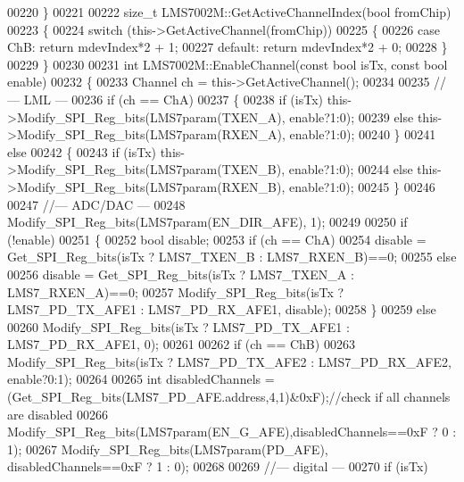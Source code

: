 \begin{DoxyCode}
00220 \}
00221 
00222 \textcolor{keywordtype}{size\_t} LMS7002M::GetActiveChannelIndex(\textcolor{keywordtype}{bool} fromChip)
00223 \{
00224     \textcolor{keywordflow}{switch} (this->GetActiveChannel(fromChip))
00225     \{
00226     \textcolor{keywordflow}{case} ChB: \textcolor{keywordflow}{return} mdevIndex*2 + 1;
00227     \textcolor{keywordflow}{default}: \textcolor{keywordflow}{return} mdevIndex*2 + 0;
00228     \}
00229 \}
00230 
00231 \textcolor{keywordtype}{int} LMS7002M::EnableChannel(\textcolor{keyword}{const} \textcolor{keywordtype}{bool} isTx, \textcolor{keyword}{const} \textcolor{keywordtype}{bool} enable)
00232 \{
00233     Channel ch = this->GetActiveChannel();
00234 
00235     \textcolor{comment}{//--- LML ---}
00236     \textcolor{keywordflow}{if} (ch == ChA)
00237     \{
00238         \textcolor{keywordflow}{if} (isTx) this->Modify_SPI_Reg_bits(LMS7param(TXEN_A), enable?1:0);
00239         \textcolor{keywordflow}{else}      this->Modify_SPI_Reg_bits(LMS7param(RXEN_A), enable?1:0);
00240     \}
00241     \textcolor{keywordflow}{else}
00242     \{
00243         \textcolor{keywordflow}{if} (isTx) this->Modify_SPI_Reg_bits(LMS7param(TXEN_B), enable?1:0);
00244         \textcolor{keywordflow}{else}      this->Modify_SPI_Reg_bits(LMS7param(RXEN_B), enable?1:0);
00245     \}
00246 
00247     \textcolor{comment}{//--- ADC/DAC ---}
00248     Modify_SPI_Reg_bits(LMS7param(EN_DIR_AFE), 1);
00249 
00250     \textcolor{keywordflow}{if} (!enable)
00251     \{
00252         \textcolor{keywordtype}{bool} disable;
00253         \textcolor{keywordflow}{if} (ch == ChA)
00254             disable = Get_SPI_Reg_bits(isTx ? LMS7_TXEN_B : LMS7_RXEN_B)==0;
00255         \textcolor{keywordflow}{else}
00256             disable = Get_SPI_Reg_bits(isTx ? LMS7_TXEN_A : LMS7_RXEN_A)==0;
00257         Modify_SPI_Reg_bits(isTx ? LMS7_PD_TX_AFE1 : LMS7_PD_RX_AFE1, disable);
00258     \}
00259     \textcolor{keywordflow}{else}
00260         Modify_SPI_Reg_bits(isTx ? LMS7_PD_TX_AFE1 : LMS7_PD_RX_AFE1, 0);
00261 
00262     \textcolor{keywordflow}{if} (ch == ChB)
00263         Modify_SPI_Reg_bits(isTx ? LMS7_PD_TX_AFE2 : LMS7_PD_RX_AFE2, enable?0:1);
00264 
00265     \textcolor{keywordtype}{int} disabledChannels = (Get_SPI_Reg_bits(LMS7_PD_AFE.address,4,1)&0xF);\textcolor{comment}{//check if all channels are
       disabled}
00266     Modify_SPI_Reg_bits(LMS7param(EN_G_AFE),disabledChannels==0xF ? 0 : 1);
00267     Modify_SPI_Reg_bits(LMS7param(PD_AFE), disabledChannels==0xF ? 1 : 0);
00268 
00269     \textcolor{comment}{//--- digital ---}
00270     \textcolor{keywordflow}{if} (isTx)

\end{DoxyCode}
